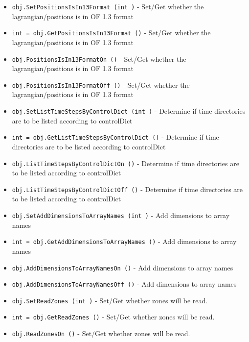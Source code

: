 \begin{itemize}
\item  \verb|obj.SetPositionsIsIn13Format (int )| -  Set/Get whether the lagrangian/positions is in OF 1.3 format

\item  \verb|int = obj.GetPositionsIsIn13Format ()| -  Set/Get whether the lagrangian/positions is in OF 1.3 format

\item  \verb|obj.PositionsIsIn13FormatOn ()| -  Set/Get whether the lagrangian/positions is in OF 1.3 format

\item  \verb|obj.PositionsIsIn13FormatOff ()| -  Set/Get whether the lagrangian/positions is in OF 1.3 format

\item  \verb|obj.SetListTimeStepsByControlDict (int )| -  Determine if time directories are to be listed according to controlDict

\item  \verb|int = obj.GetListTimeStepsByControlDict ()| -  Determine if time directories are to be listed according to controlDict

\item  \verb|obj.ListTimeStepsByControlDictOn ()| -  Determine if time directories are to be listed according to controlDict

\item  \verb|obj.ListTimeStepsByControlDictOff ()| -  Determine if time directories are to be listed according to controlDict

\item  \verb|obj.SetAddDimensionsToArrayNames (int )| -  Add dimensions to array names

\item  \verb|int = obj.GetAddDimensionsToArrayNames ()| -  Add dimensions to array names

\item  \verb|obj.AddDimensionsToArrayNamesOn ()| -  Add dimensions to array names

\item  \verb|obj.AddDimensionsToArrayNamesOff ()| -  Add dimensions to array names

\item  \verb|obj.SetReadZones (int )| -  Set/Get whether zones will be read.

\item  \verb|int = obj.GetReadZones ()| -  Set/Get whether zones will be read.

\item  \verb|obj.ReadZonesOn ()| -  Set/Get whether zones will be read.


\end{itemize}
